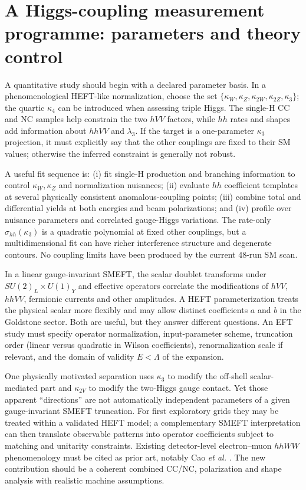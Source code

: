 \documentclass[12pt,a4paper]{article}
\newcommand{\newnote}{\clearpage}
\begin{document}
\newnote

\section{A Higgs-coupling measurement programme: parameters and theory control}
A quantitative study should begin with a declared parameter basis. In a phenomenological HEFT-like normalization, choose the set $\{\kappa_W,\kappa_Z,\kappa_{2W},\kappa_{2Z},\kappa_3\}$; the quartic $\kappa_4$ can be introduced when assessing triple Higgs. The single-H CC and NC samples help constrain the two $hVV$ factors, while $hh$ rates and shapes add information about $hhVV$ and $\lambda_3$. If the target is a one-parameter $\kappa_3$ projection, it must explicitly say that the other couplings are fixed to their SM values; otherwise the inferred constraint is generally not robust.

A useful fit sequence is: (i) fit single-H production and branching information to control $\kappa_W,\kappa_Z$ and normalization nuisances; (ii) evaluate $hh$ coefficient templates at several physically consistent anomalous-coupling points; (iii) combine total and differential yields at both energies and beam polarizations; and (iv) profile over nuisance parameters and correlated gauge-Higgs variations. The rate-only $\sigma_{hh}(\kappa_3)$ is a quadratic polynomial at fixed other couplings, but a multidimensional fit can have richer interference structure and degenerate contours. No coupling limits have been produced by the current 48-run SM scan.

In a linear gauge-invariant SMEFT, the scalar doublet transforms under $SU(2)_L\times U(1)_Y$ and effective operators correlate the modifications of $hVV$, $hhVV$, fermionic currents and other amplitudes. A HEFT parameterization treats the physical scalar more flexibly and may allow distinct coefficients $a$ and $b$ in the Goldstone sector. Both are useful, but they answer different questions. An EFT study must specify operator normalization, input-parameter scheme, truncation order (linear versus quadratic in Wilson coefficients), renormalization scale if relevant, and the domain of validity $E<\Lambda$ of the expansion.

One physically motivated separation uses $\kappa_3$ to modify the off-shell scalar-mediated part and $\kappa_{2V}$ to modify the two-Higgs gauge contact. Yet those apparent ``directions'' are not automatically independent parameters of a given gauge-invariant SMEFT truncation. For first exploratory grids they may be treated within a validated HEFT model; a complementary SMEFT interpretation can then translate observable patterns into operator coefficients subject to matching and unitarity constraints. Existing detector-level electron--muon $hhWW$ phenomenology must be cited as prior art, notably Cao \emph{et al.} \cite{cao}. The new contribution should be a coherent combined CC/NC, polarization and shape analysis with realistic machine assumptions.
\end{document}
